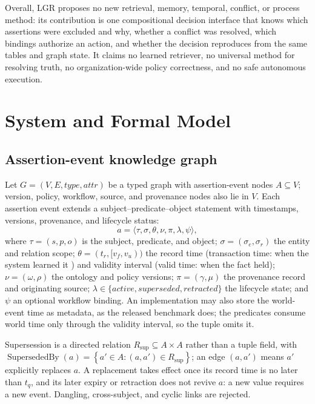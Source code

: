 \documentclass[conference]{IEEEtran}
\newcommand{\lgr}{\textsc{LGR}\xspace}
\newcommand{\set}[1]{\left\{#1\right\}}
\begin{document}
Overall, \lgr proposes no new retrieval, memory, temporal, conflict, or process method: its contribution is one compositional decision interface that knows which assertions were excluded and why, whether a conflict was resolved, which bindings authorize an action, and whether the decision reproduces from the same tables and graph state. It claims no learned retriever, no universal method for resolving truth, no organization-wide policy correctness, and no safe autonomous execution.

\section{System and Formal Model}
\label{sec:model}
\subsection{Assertion-event knowledge graph}
Let $G=(V,E,\mathit{type},\mathit{attr})$ be a typed graph with assertion-event nodes $A\subseteq V$; version, policy, workflow, source, and provenance nodes also lie in $V$. Each assertion event extends a subject--predicate--object statement with timestamps, versions, provenance, and lifecycle status:
\begin{equation}
a=\langle\tau,\sigma,\theta,\nu,\pi,\lambda,\psi\rangle,
\label{eq:assertion}
\end{equation}
where $\tau=(s,p,o)$ is the subject, predicate, and object; $\sigma=(\sigma_e,\sigma_r)$ the entity and relation scope; $\theta=(t_r,[v_f,v_u))$ the record time (transaction time: when the system learned it \cite{bitemporal}) and validity interval (valid time: when the fact held); $\nu=(\omega,\rho)$ the ontology and policy versions; $\pi=(\gamma,\mu)$ the provenance record and originating source; $\lambda\in\{\mathit{active},\mathit{superseded},\mathit{retracted}\}$ the lifecycle state; and $\psi$ an optional workflow binding. An implementation may also store the world-event time as metadata, as the released benchmark does; the predicates consume world time only through the validity interval, so the tuple omits it.

Supersession is a directed relation $R_{\mathrm{sup}}\subseteq A\times A$ rather than a tuple field, with $\operatorname{SupersededBy}(a)=\set{a'\in A:(a,a')\in R_{\mathrm{sup}}}$; an edge $(a,a')$ means $a'$ explicitly replaces $a$. A replacement takes effect once its record time is no later than $t_q$, and its later expiry or retraction does not revive $a$: a new value requires a new event. Dangling, cross-subject, and cyclic links are rejected.
\end{document}
